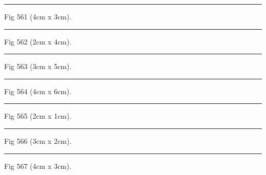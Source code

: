 \documentclass[a4paper,11pt]{article}
\begin{document}
\begin{swarmwrap}%
  \begin{minipage}[t]{4cm}
    \centering
    \rule{\linewidth}{3cm}
    {\footnotesize Fig 561 (4cm x 3cm).}
  \end{minipage}%
\end{swarmwrap}%
\swarmwrapnext
\lipsum[111]%

\begin{swarmwrap}%
  \begin{minipage}[t]{2cm}
    \centering
    \rule{\linewidth}{4cm}
    {\footnotesize Fig 562 (2cm x 4cm).}
  \end{minipage}%
\end{swarmwrap}%
\swarmwrapnext
\lipsum[112]%

\begin{swarmwrap}%
  \begin{minipage}[t]{3cm}
    \centering
    \rule{\linewidth}{5cm}
    {\footnotesize Fig 563 (3cm x 5cm).}
  \end{minipage}%
\end{swarmwrap}%
\swarmwrapnext
\lipsum[113]%

\begin{swarmwrap}%
  \begin{minipage}[t]{4cm}
    \centering
    \rule{\linewidth}{6cm}
    {\footnotesize Fig 564 (4cm x 6cm).}
  \end{minipage}%
\end{swarmwrap}%
\swarmwrapnext
\lipsum[114]%

\begin{swarmwrap}%
  \begin{minipage}[t]{2cm}
    \centering
    \rule{\linewidth}{1cm}
    {\footnotesize Fig 565 (2cm x 1cm).}
  \end{minipage}%
\end{swarmwrap}%
\swarmwrapnext
\lipsum[115]%

\begin{swarmwrap}%
  \begin{minipage}[t]{3cm}
    \centering
    \rule{\linewidth}{2cm}
    {\footnotesize Fig 566 (3cm x 2cm).}
  \end{minipage}%
\end{swarmwrap}%
\swarmwrapnext
\lipsum[116]%

\begin{swarmwrap}%
  \begin{minipage}[t]{4cm}
    \centering
    \rule{\linewidth}{3cm}
    {\footnotesize Fig 567 (4cm x 3cm).}
  \end{minipage}%
\end{swarmwrap}%
\swarmwrapnext
\lipsum[117]%
\end{document}
